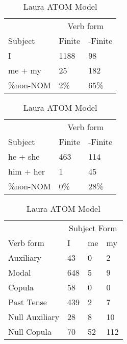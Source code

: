 \begin{table}[]
\caption{Laura ATOM Model}
\begin{minipage}{0.5\textwidth}
    \centering
    \begin{tabular}{@{}lll@{}}
        \toprule
         & \multicolumn{2}{c}{Verb form}\\
         \cline{2-3}
        Subject & Finite & -Finite \\
        \midrule
        I & 1188 & 98 \\
        me + my & 25 & 182 \\
        \hline
        \%non-NOM & 2\% & 65\% \\
        \bottomrule
    \end{tabular}
\end{minipage}
\begin{minipage}{0.5\textwidth}
    \centering
    \begin{tabular}{@{}lll@{}}
        \toprule
         & \multicolumn{2}{c}{Verb form}\\
         \cline{2-3}
        Subject & Finite & -Finite \\
        \midrule
        he + she & 463 & 114 \\
        him + her & 1 & 45 \\
        \hline
        \%non-NOM & 0\% & 28\% \\
        \bottomrule
    \end{tabular}
    \end{minipage}
\begin{minipage}{0.5\textwidth}
    \centering
    \begin{tabular}{@{}llll@{}}
        \toprule
            &\multicolumn{3}{c}{Subject Form}\\
            \cline{2-4}
        Verb form & I & me & my \\
        \midrule
        Auxiliary & 43 & 0 & 2 \\
        Modal & 648 & 5 & 9 \\
        Copula & 58 & 0 & 0 \\
        Past Tense & 439 & 2 & 7 \\
        \hline
        Null Auxiliary & 28 & 8 & 10 \\
        Null Copula & 70 & 52 & 112 \\
        \bottomrule
    \end{tabular}

\end{minipage}
\end{table}
